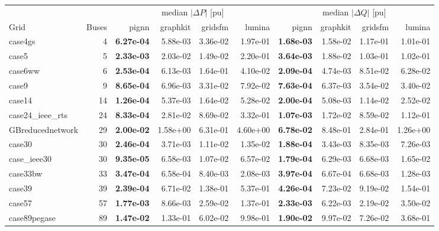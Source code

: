 \documentclass[10pt]{article}
\begin{document}
\begin{table}[H]
\centering\small
\setlength{\tabcolsep}{3.5pt}
\begin{tabular}{lr rrrr rrrr}
\toprule
 & & \multicolumn{4}{c}{median $|\Delta P|$ [pu]} & \multicolumn{4}{c}{median $|\Delta Q|$ [pu]} \\
\cmidrule(lr){3-6}\cmidrule(lr){7-10}
Grid & Buses & pignn & graphkit & gridsfm & lumina & pignn & graphkit & gridsfm & lumina \\
\midrule
case4gs & 4 & \textbf{6.27e-04} & 5.88e-03 & 3.36e-02 & 1.97e-01 & \textbf{1.68e-03} & 1.58e-02 & 1.17e-01 & 1.01e-01 \\
case5 & 5 & \textbf{2.33e-03} & 2.03e-02 & 1.49e-02 & 2.20e-01 & \textbf{3.64e-03} & 1.88e-02 & 1.03e-01 & 1.02e-01 \\
case6ww & 6 & \textbf{2.53e-04} & 6.13e-03 & 1.64e-01 & 4.10e-02 & \textbf{2.09e-04} & 4.74e-03 & 8.51e-02 & 6.28e-02 \\
case9 & 9 & \textbf{8.65e-04} & 6.96e-03 & 3.31e-02 & 7.92e-02 & \textbf{7.63e-04} & 6.37e-03 & 3.54e-02 & 3.40e-02 \\
case14 & 14 & \textbf{1.26e-04} & 5.37e-03 & 1.64e-02 & 5.28e-02 & \textbf{2.00e-04} & 5.08e-03 & 1.14e-02 & 2.52e-02 \\
case24\_ieee\_rts & 24 & \textbf{8.33e-04} & 2.81e-02 & 8.69e-02 & 3.32e-01 & \textbf{1.07e-03} & 1.72e-02 & 8.59e-02 & 1.12e-01 \\
GBreducednetwork & 29 & \textbf{2.00e-02} & 1.58e+00 & 6.31e-01 & 4.60e+00 & \textbf{6.78e-02} & 8.48e-01 & 2.84e-01 & 1.26e+00 \\
case30 & 30 & \textbf{2.46e-04} & 3.71e-03 & 1.11e-02 & 1.35e-02 & \textbf{1.88e-04} & 3.43e-03 & 8.35e-03 & 7.26e-03 \\
case\_ieee30 & 30 & \textbf{9.35e-05} & 6.58e-03 & 1.07e-02 & 6.57e-02 & \textbf{1.79e-04} & 6.29e-03 & 6.68e-03 & 1.65e-02 \\
case33bw & 33 & \textbf{3.47e-04} & 6.58e-04 & 8.40e-03 & 2.08e-03 & \textbf{3.97e-04} & 6.67e-04 & 6.68e-03 & 1.28e-03 \\
case39 & 39 & \textbf{2.39e-04} & 6.71e-02 & 1.38e-01 & 5.37e-01 & \textbf{4.26e-04} & 7.23e-02 & 9.19e-02 & 1.54e-01 \\
case57 & 57 & \textbf{1.77e-03} & 8.66e-03 & 2.59e-02 & 1.37e-01 & \textbf{2.33e-03} & 6.22e-03 & 2.19e-02 & 3.50e-02 \\
case89pegase & 89 & \textbf{1.47e-02} & 1.33e-01 & 6.02e-02 & 9.98e-01 & \textbf{1.90e-02} & 9.97e-02 & 7.26e-02 & 3.68e-01 \\

\end{tabular}
\end{table}
\end{document}

